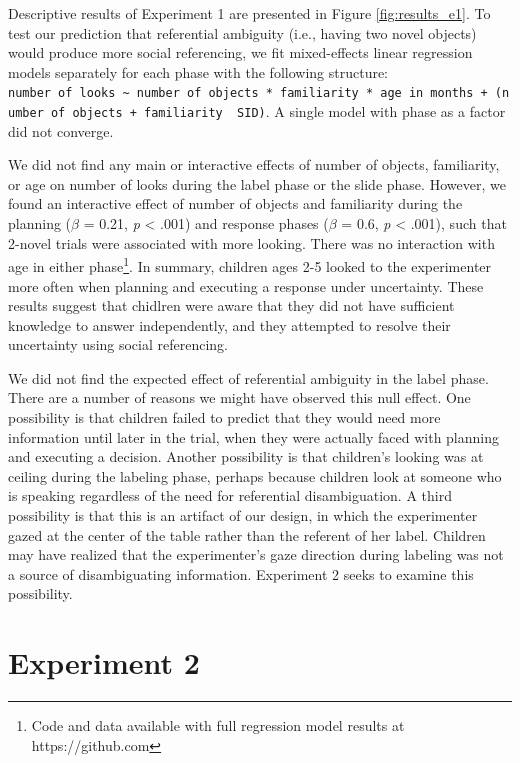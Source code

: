 \documentclass[10pt, letterpaper]{article}
\begin{document}
Descriptive results of Experiment 1 are presented in Figure
\ref{fig:results_e1}. To test our prediction that referential ambiguity
(i.e., having two novel objects) would produce more social referencing,
we fit mixed-effects linear regression models separately for each phase
with the following structure:
\texttt{number\ of\ looks\ \textasciitilde{}\ number\ of\ objects\ *\ familiarity\ *\ age\ in\ months\ +\ (number\ of\ objects\ +\ familiarity\ \textbar{}\ SID)}.
A single model with phase as a factor did not converge.

We did not find any main or interactive effects of number of objects,
familiarity, or age on number of looks during the label phase or the
slide phase. However, we found an interactive effect of number of
objects and familiarity during the planning (\(\beta\) = 0.21, \emph{p}
\textless{} .001) and response phases (\(\beta\) = 0.6, \emph{p}
\textless{} .001), such that 2-novel trials were associated with more
looking. There was no interaction with age in either
phase\footnote{Code and data available with full regression model results at https://github.com}.
In summary, children ages 2-5 looked to the experimenter more often when
planning and executing a response under uncertainty. These results
suggest that chidlren were aware that they did not have sufficient
knowledge to answer independently, and they attempted to resolve their
uncertainty using social referencing.

We did not find the expected effect of referential ambiguity in the
label phase. There are a number of reasons we might have observed this
null effect. One possibility is that children failed to predict that
they would need more information until later in the trial, when they
were actually faced with planning and executing a decision. Another
possibility is that children's looking was at ceiling during the
labeling phase, perhaps because children look at someone who is speaking
regardless of the need for referential disambiguation. A third
possibility is that this is an artifact of our design, in which the
experimenter gazed at the center of the table rather than the referent
of her label. Children may have realized that the experimenter's gaze
direction during labeling was not a source of disambiguating
information. Experiment 2 seeks to examine this possibility.

\section{Experiment 2}\label{experiment-2}
\end{document}

